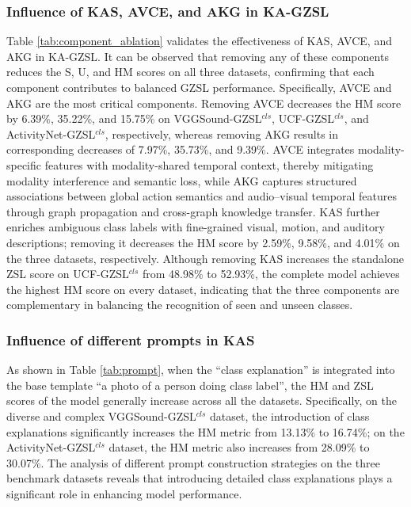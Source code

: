 \documentclass[lettersize,journal]{IEEEtran}
\begin{document}
\subsubsection{Influence of KAS, AVCE, and AKG in KA-GZSL}
Table \ref{tab:component_ablation} validates the effectiveness of KAS, AVCE, and AKG in KA-GZSL. It can be observed that removing any of these components reduces the S, U, and HM scores on all three datasets, confirming that each component contributes to balanced GZSL performance. Specifically, AVCE and AKG are the most critical components. Removing AVCE decreases the HM score by 6.39\%, 35.22\%, and 15.75\% on VGGSound-GZSL$^{\textit{cls}}$, UCF-GZSL$^{\textit{cls}}$, and ActivityNet-GZSL$^{\textit{cls}}$, respectively, whereas removing AKG results in corresponding decreases of 7.97\%, 35.73\%, and 9.39\%. AVCE integrates modality-specific features with modality-shared temporal context, thereby mitigating modality interference and semantic loss, while AKG captures structured associations between global action semantics and audio--visual temporal features through graph propagation and cross-graph knowledge transfer. KAS further enriches ambiguous class labels with fine-grained visual, motion, and auditory descriptions; removing it decreases the HM score by 2.59\%, 9.58\%, and 4.01\% on the three datasets, respectively. Although removing KAS increases the standalone ZSL score on UCF-GZSL$^{\textit{cls}}$ from 48.98\% to 52.93\%, the complete model achieves the highest HM score on every dataset, indicating that the three components are complementary in balancing the recognition of seen and unseen classes.

\subsubsection{Influence of different prompts in KAS}
As shown in Table \ref{tab:prompt}, when the “class explanation” is integrated into the base template “a photo of a person doing {class label}”, the HM and ZSL scores of the model generally increase across all the datasets. Specifically, on the diverse and complex VGGSound-GZSL$^{\textit{cls}}$ dataset, the introduction of class explanations significantly increases the HM metric from 13.13\% to 16.74\%; on the ActivityNet-GZSL$^{\textit{cls}}$ dataset, the HM metric also increases from 28.09\% to 30.07\%. The analysis of different prompt construction strategies on the three benchmark datasets reveals that introducing detailed class explanations plays a significant role in enhancing model performance.
\end{document}
